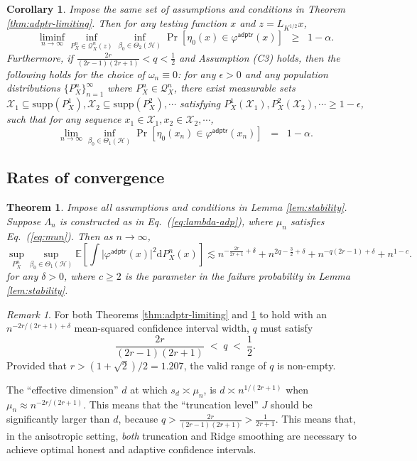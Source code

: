 \documentclass[11pt,a4paper]{article}
\theoremstyle{definition}
\theoremstyle{plain}
\newtheorem{theorem}{Theorem}[section]
\newtheorem{corollary}{Corollary}[section]
\theoremstyle{remark}
\newtheorem{remark}{Remark}[section]
\newcommand{\supp}{\mathrm{supp}}
\newcommand{\mX}{\mathcal X}
\newcommand{\ud}{\mathrm d}
\newcommand{\mH}{\mathcal H}
\newcommand{\adptr}{\mathsf{adptr}}
\begin{document}
\begin{corollary}
Impose the same set of assumptions and conditions in Theorem \ref{thm:adptr-limiting}. Then
for any testing function $x$ and $z=L_{K^{1/2}}x$,
$$
\liminf_{n\to\infty}\inf_{P_X^n\in\mathcal Q_X^n(z)}\inf_{\beta_0\in\Theta_2(\mH)}\Pr[\eta_0(x)\in\varphi^\adptr(x)] \;\;\geq\;\; 1-\alpha.
$$
Furthermore, if $\frac{2r}{(2r-1)(2r+1)}<q<\frac{1}{2}$ and Assumption (C3) holds, then the following holds for the choice of $\omega_n\equiv 0$:
for any $\epsilon>0$ and any population distributions $\{P_X^n\}_{n=1}^{\infty}$ where $P_X^n\in\mathcal Q_X^n$, there exist measurable sets $\mX_1\subseteq\supp(P_X^1),\mX_2\subseteq\supp(P_X^2),\cdots$ satisfying $P_X^1(\mX_1),P_X^2(\mX_2),\cdots\geq 1-\epsilon$,
such that for any sequence $x_1\in\mX_1,x_2\in\mX_2,\cdots$, 
$$
\lim_{n\to\infty}\inf_{\beta_0\in\Theta_1(\mH)} \Pr[\eta_0(x_n)\in\varphi^\adptr(x_n)] \;\; = \;\; 1-\alpha.
$$
\label{cor:adptr}
\end{corollary}



\subsection{Rates of convergence}


\begin{theorem}
Impose all assumptions and conditions in Lemma \ref{lem:stability}. Suppose $\Lambda_n$ is constructed as in Eq.~(\ref{eq:lambda-adp}),
where $\mu_n$ satisfies Eq.~(\ref{eq:mun}). Then as $n\to\infty$, 
$$
\sup_{P_X^n}\sup_{\beta_0\in\Theta_1(\mH)}\mathbb E\left[\int \big|\varphi^\adptr(x)\big|^2\ud P_X^n(x) \right] \lesssim n^{-\frac{2r}{2r+1}+\delta} + n^{2q-\frac{3}{2}+\delta} + n^{-q(2r-1)+\delta} + n^{1-c}.
$$
for any $\delta>0$, where $c\geq 2$ is the parameter in the failure probability in Lemma \ref{lem:stability}.
\label{thm:adptr-rates}
\end{theorem}

\begin{remark}
For both Theorems \ref{thm:adptr-limiting} and \ref{thm:adptr-rates} to hold with an $n^{-2r/(2r+1)+\delta}$ mean-squared confidence interval width, $q$ must satisfy
$$
\frac{2r}{(2r-1)(2r+1)}\;<\; q\;<\; \frac{1}{2}.
$$
Provided that $r>(1+\sqrt{2})/2=1.207$, the valid range of $q$ is non-empty.
\end{remark}


The ``effective dimension'' $d$ at which $s_d\asymp \mu_n$, is $d\asymp n^{1/(2r+1)}$ when $\mu_n\approx n^{-2r/(2r+1)}$.
This means that the ``truncation level'' $J$ should be significantly larger than $d$, because $q>\frac{2r}{(2r-1)(2r+1)} > \frac{1}{2r+1}$.
This means that, in the anisotropic setting, \emph{both} truncation and Ridge smoothing are necessary to achieve optimal honest and adaptive confidence intervals.
\end{document}
